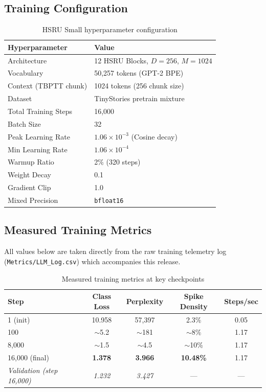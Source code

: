 \documentclass[11pt]{article}
\begin{document}
\subsection{Training Configuration}
\begin{table}[h!]
\centering
\caption{HSRU Small hyperparameter configuration}
\begin{tabular}{@{}ll@{}}
\toprule
\textbf{Hyperparameter} & \textbf{Value} \\
\midrule
Architecture & 12 HSRU Blocks, $D=256$, $M=1024$ \\
Vocabulary & 50,257 tokens (GPT-2 BPE) \\
Context (TBPTT chunk) & 1024 tokens (256 chunk size) \\
Dataset & TinyStories pretrain mixture \\
Total Training Steps & 16,000 \\
Batch Size & 32 \\
Peak Learning Rate & $1.06 \times 10^{-3}$ (Cosine decay) \\
Min Learning Rate & $1.06 \times 10^{-4}$ \\
Warmup Ratio & 2\% (320 steps) \\
Weight Decay & 0.1 \\
Gradient Clip & 1.0 \\
Mixed Precision & \texttt{bfloat16} \\
\bottomrule
\end{tabular}
\end{table}

\subsection{Measured Training Metrics}
All values below are taken directly from the raw training telemetry log (\texttt{Metrics/LLM\_Log.csv}) which accompanies this release.

\begin{table}[h!]
\centering
\caption{Measured training metrics at key checkpoints}
\begin{tabular}{@{}lcccc@{}}
\toprule
\textbf{Step} & \textbf{Class Loss} & \textbf{Perplexity} & \textbf{Spike Density} & \textbf{Steps/sec} \\
\midrule
1 (init) & 10.958 & 57,397 & 2.3\% & 0.05 \\
100 & $\sim$5.2 & $\sim$181 & $\sim$8\% & 1.17 \\
8,000 & $\sim$1.5 & $\sim$4.5 & $\sim$10\% & 1.17 \\
16,000 (final) & \textbf{1.378} & \textbf{3.966} & \textbf{10.48\%} & 1.17 \\
\midrule
\textit{Validation (step 16,000)} & \textit{1.232} & \textit{3.427} & — & — \\
\bottomrule
\end{tabular}
\end{table}
\end{document}
